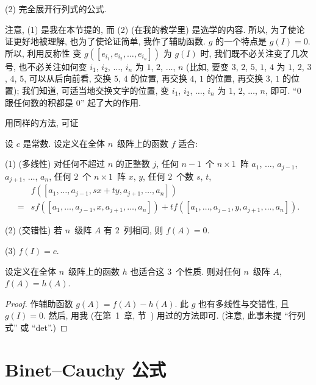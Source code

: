 \documentclass[../libro.tex]{subfiles}
\begin{document}
(2)
完全展开行列式的公式.

注意, (1) 是我在本节提的,
而 (2) (在我的教学里) 是选学的内容.
所以, 为了使论证更好地被理解,
也为了使论证简单,
我作了辅助函数.
\(g\) 的一个特点是 \(g(I) = 0\).
所以, 利用反称性%
变 \(g([e_{i_1}, e_{i_2}, \dots, e_{i_n}])\)
为 \(g(I)\) 时,
我们既不必关注变了几次号,
也不必关注如何变
\(i_1\), \(i_2\), \(\dots\), \(i_n\)
为 \(1\), \(2\), \(\dots\), \(n\)
(比如, 要变 \(3\), \(2\), \(5\), \(1\), \(4\) %
为 \(1\), \(2\), \(3\), \(4\), \(5\),
可以从后向前看,
交换 \(5\), \(4\) 的位置,
再交换 \(4\), \(1\) 的位置,
再交换 \(3\), \(1\) 的位置); %
我们知道, 可适当地交换文字的位置,
变 \(i_1\), \(i_2\), \(\dots\), \(i_n\)
为 \(1\), \(2\), \(\dots\), \(n\),
即可.
``\(0\) 跟任何数的积都是 \(0\)''
起了大的作用.

用同样的方法, 可证

\begin{theorem}
    设 \(c\) 是常数.
    设定义在全体 \(n\)~级阵上的函数 \(f\) 适合:

    (1)
    (多线性)
    对任何不超过 \(n\) 的正整数 \(j\),
    任何 \(n-1\)~个 \(n \times 1\)~阵
    \(a_1\), \(\dots\), \(a_{j-1}\),
    \(a_{j+1}\), \(\dots\), \(a_n\),
    任何 \(2\)~个 \(n \times 1\)~阵 \(x\), \(y\),
    任何 \(2\)~个数 \(s\), \(t\),
    \begin{align*}
        &
        f([a_1, \dots, a_{j-1}, sx + ty, a_{j+1}, \dots, a_n])
        \\
        = {} &
        s f([a_1, \dots, a_{j-1}, x, a_{j+1}, \dots, a_n])
        + t f([a_1, \dots, a_{j-1}, y, a_{j+1}, \dots, a_n]).
    \end{align*}

    (2)
    (交错性)
    若 \(n\)~级阵 \(A\) 有 \(2\)~列相同,
    则 \(f(A) = 0\).

    (3)
    \(f(I) = c\).

    设定义在全体 \(n\)~级阵上的函数 \(h\)
    也适合这 \(3\)~个性质.
    则对任何 \(n\)~级阵 \(A\), \(f(A) = h(A)\).
\end{theorem}

\begin{proof}
    作辅助函数 \(g(A) = f(A) - h(A)\).
    此 \(g\) 也有多线性与交错性,
    且 \(g(I) = 0\).
    然后, 用我 (在第~1~章, 节~) 用过的方法即可.
    (注意, 此事未提 ``行列式'' 或 ``det''.)
\end{proof}

\section{Binet--Cauchy 公式}
\end{document}
